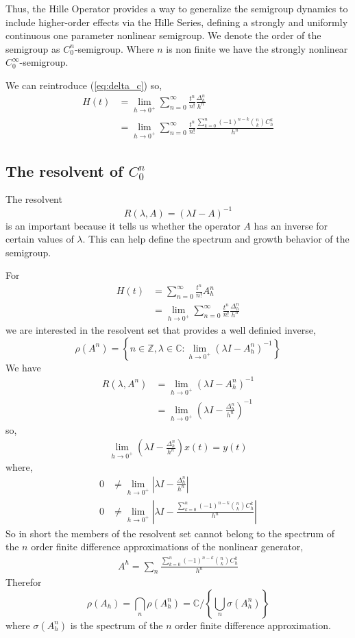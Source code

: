 \documentclass{article}
\newcommand{\Z}{\mathbb{Z}}
\newcommand{\C}{\mathbb{C}}
\begin{document}
Thus, the Hille Operator provides a way to generalize the semigroup dynamics to include higher-order effects via the Hille Series, defining a strongly and uniformly continuous one parameter nonlinear semigroup. We denote the order of the semigroup as $C_0^n$-semigroup. Where $n$ is non finite we have the strongly nonlinear $C_0^\infty$-semigroup. 

We can reintroduce (\ref{eq:delta_c}) so,
\begin{align*}
    H(t)  &= \lim_{h\rightarrow0^+} \sum_{n=0}^\infty \frac{t^n}{n!} \frac{\Delta_h^n}{h^n} \\
    &= \lim_{h\rightarrow0^+} \sum_{n=0}^\infty \frac{t^n}{n!} \frac{ \sum_{k=0}^n (-1)^{n-k} {n \choose k} C_h^k}{h^n}
\end{align*}

\subsection{The resolvent of $C^n_0$}

The resolvent 
$$
    R(\lambda, A) = (\lambda I - A)^{-1}
$$
is an important because it tells us whether the operator $A$ has an inverse for certain values of $\lambda$. This can help define the spectrum and growth behavior of the semigroup.

For
\begin{align*}
    H(t) &= \sum_{n=0}^\infty \frac{t^n}{n!} A^n_h \nonumber\\
    &= \lim_{h\rightarrow0^+} \sum_{n=0}^\infty \frac{t^n}{n!} \frac{\Delta_h^n}{h^n}
\end{align*}
we are interested in the resolvent set that provides a well definied inverse,
$$
    \rho(A^n) = \left\{ n\in\Z, \lambda\in\C: \lim_{h\rightarrow0^+} \left( \lambda I - A^n_h \right) ^{-1}\right\}
$$ 
We have
\begin{align*}
     R(\lambda, A^n) &= \lim_{h\rightarrow0^+}\left( \lambda I - A^n_h\right) ^{-1}\\
      &= \lim_{h\rightarrow0^+}\left( \lambda I - \frac{\Delta^n_h}{h^n} \right) ^{-1}
\end{align*}
so,
\begin{align*}
    \lim_{h\rightarrow0^+} \left( \lambda I- \frac{\Delta^n_h}{h^n}\right)x(t) = y(t)
\end{align*}
where,
\begin{align*}
     0 &\neq \lim_{h\rightarrow0^+} \left| \lambda I- \frac{\Delta^n_h}{h^n} \right| \\
      0 &\neq \lim_{h\rightarrow0^+} \left| \lambda I - \frac{ \sum_{k=0}^n (-1)^{n-k} {n \choose k} C_h^k}{h^n} \right|
\end{align*}
So in short the members of the resolvent set cannot belong to the spectrum of the $n$ order finite difference approximations of the nonlinear generator,
\begin{align*}
    A^h = \sum_{n} \frac{\sum_{k=0}^n (-1)^{n-k} {n \choose k} C_h^k}{h^n}
\end{align*}
Therefor
$$
    \rho(A_h) = \bigcap_n \rho(A^n_h) = \C / \left\{\bigcup_n \sigma(A^n_h)\right\}
$$ 
where $\sigma(A^n_h)$ is the spectrum of the $n$ order finite difference approximation.
\end{document}
